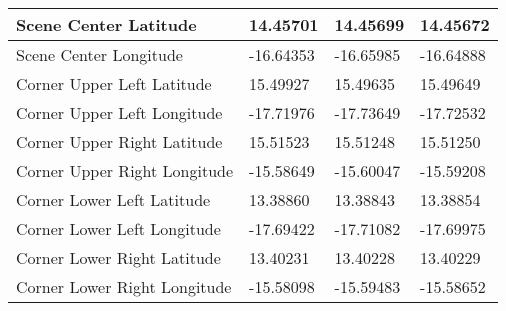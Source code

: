 \begin{table}[!ht]
\begin{tabular}{|l|l|l|l|}
        Scene Center Latitude & 14.45701 & 14.45699 & 14.45672 \\ \hline
        Scene Center Longitude & -16.64353 & -16.65985 & -16.64888 \\ \hline
        Corner Upper Left Latitude & 15.49927 & 15.49635 & 15.49649 \\ \hline
        Corner Upper Left Longitude & -17.71976 & -17.73649 & -17.72532 \\ \hline
        Corner Upper Right Latitude & 15.51523 & 15.51248 & 15.51250 \\ \hline
        Corner Upper Right Longitude & -15.58649 & -15.60047 & -15.59208 \\ \hline
        Corner Lower Left Latitude & 13.38860 & 13.38843 & 13.38854 \\ \hline
        Corner Lower Left Longitude & -17.69422 & -17.71082 & -17.69975 \\ \hline
        Corner Lower Right Latitude & 13.40231 & 13.40228 & 13.40229 \\ \hline
        Corner Lower Right Longitude & -15.58098 & -15.59483 & -15.58652 \\ \hline
    \end{tabular}
\end{table}